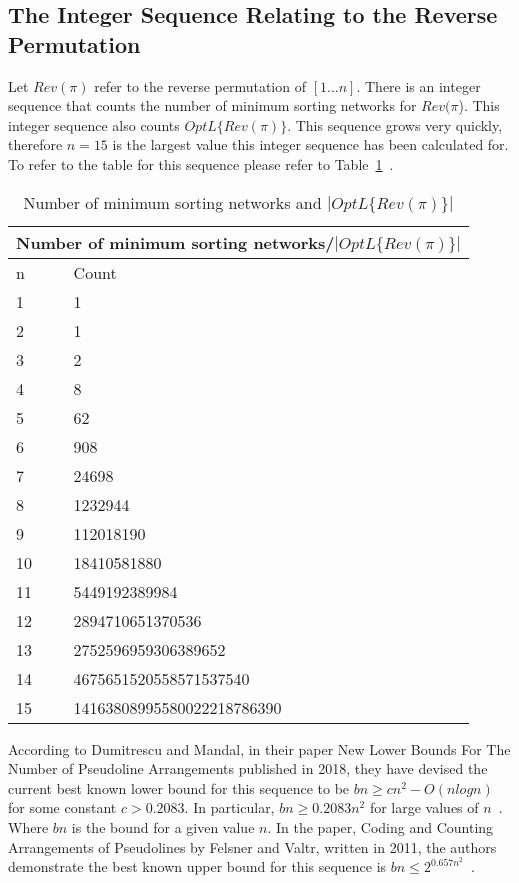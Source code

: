 \subsection{The Integer Sequence Relating to the Reverse Permutation}
Let $Rev(\pi)$ refer to the reverse permutation of $[1 \dots n]$. There is an integer sequence that counts the number of minimum sorting networks 
for $Rev(\pi$). This integer sequence also counts $OptL\{Rev(\pi)\}$. This sequence grows very quickly, therefore $n=15$ 
is  the largest value this integer sequence has been calculated for. To refer to the table for this sequence 
please refer to Table~\ref{Tab:IntSeq1}~\cite{A30}.
\begin{table}[t]
    \begin{center}

    \begin{tabular}{|p{2cm}||p{8cm}|}
        \hline
        \multicolumn{2}{|c|}{Number of minimum sorting networks/$|OptL\{Rev(\pi)\}|$}\\
        \hline
        n & Count \\ 
        \hline 
        1 & 1 \\
        \hline 
        2 & 1 \\
        \hline 
        3 & 2 \\
        \hline 
        4 & 8 \\
        \hline 
        5 & 62 \\
        \hline 
        6 & 908 \\
        \hline 
        7 & 24698 \\
        \hline 
        8 & 1232944 \\
        \hline 
        9 & 112018190 \\
        \hline 
        10 & 18410581880 \\
        \hline 
        11 & 5449192389984 \\ 
        \hline 
        12 & 2894710651370536 \\
        \hline 
        13 & 2752596959306389652 \\
        \hline 
        14 & 4675651520558571537540 \\
        \hline 
        15 & 14163808995580022218786390 \\
        \hline 
    \end{tabular}
    \end{center}
    \caption{Number of minimum sorting networks and $|OptL\{Rev(\pi)\}|$}
    \label{Tab:IntSeq1}
\end{table}\par
According to Dumitrescu and Mandal, in their paper New Lower Bounds For The Number of Pseudoline Arrangements 
published in 2018, they have devised the current best known lower bound for this sequence to be 
$bn\geq cn^{2} − O(n log n)$ for some constant $c > 0.2083$. In particular, $bn \geq 0.2083 n^{2}$
for large values of $n$~\cite{A33}. Where $bn$ is the bound for a given value $n$. In the paper, Coding 
and Counting Arrangements of Pseudolines by Felsner and Valtr, written in 2011, the authors demonstrate 
the best known upper bound for this sequence is $bn \leq 2^{0.657n^{2}}$~\cite{A32}.\par 

